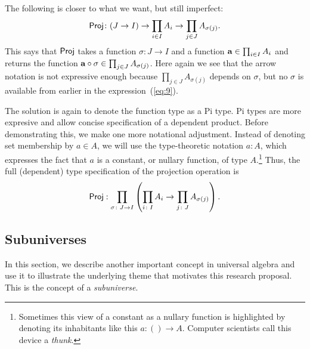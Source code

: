 \documentclass[12pt]{amsart}  %
\begin{document}
The following is closer to what we want, but still imperfect:
\begin{equation}
  \label{eq:9}
  \operatorname{\mathsf{Proj}}\colon (J \rightarrow I)\rightarrow \prod_{i\in I} A_{i} \rightarrow 
  \prod_{j\in J} A_{\sigma(j)}.
\end{equation}
This says that $\operatorname{\mathsf{Proj}}$ takes a function 
$\sigma \colon J \rightarrow I$ and a function
$\mathbf{a} \in \prod_{i\in I} A_{i}$ and returns the function 
$\mathbf{a} \circ \sigma \in \prod_{j\in J} A_{\sigma(j)}$.  
Here again we see that the arrow notation is not expressive enough
because $\prod_{j\in J} A_{\sigma(j)}$ depends on $\sigma$, but no $\sigma$
is available from earlier in the expression~(\ref{eq:9}).

The solution is again to denote the function type as a Pi type.
Pi types are more expresive and allow concise specification of a dependent
product.  Before demonstrating this, we make one more notational adjustment.  
Instead of denoting set membership by $a \in A$, we will use the 
type-theoretic notation $a \colon A$, which
expresses the fact that $a$ is a constant, or nullary function, of type $A$.\footnote{Sometimes
this view of a constant as a nullary function is highlighted by denoting 
its inhabitants like this $a \colon () \to A$. Computer scientists call this device a \emph{thunk}.} 
Thus, the full (dependent) type specification of the projection operation is
\[
\operatorname{\mathsf{Proj}}: \prod_{\sigma \colon J \rightarrow I}\left( \prod_{i\colon I} A_{i} \rightarrow 
\prod_{j\colon J} A_{\sigma(j)}\right).
\]
\fi







\subsection{Subuniverses}
\label{sec:subuniverses}
In this section, we describe another important concept in universal 
algebra and use it to illustrate the underlying theme that motivates
this research proposal. This is the concept of a \emph{subuniverse}.  %
\end{document}
